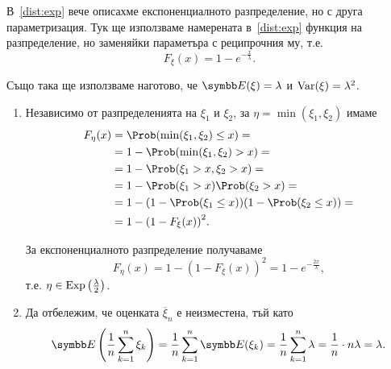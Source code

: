 \documentclass[numbers=endperiod, bibliography=totocnumbered]{scrartcl}
\begin{document}
\begin{solution}
  В~\ref{dist:exp} вече описахме експоненциалното разпределение, но с друга параметризация. Тук ще използваме намерената в~\ref{dist:exp} функция на разпределение, но заменяйки параметъра с реципрочния му, т.е.
  \begin{equation*}
    F_\xi(x) = 1 - e^{-\frac x \lambda}.
  \end{equation*}

  Също така ще използваме наготово, че \( \Expect(\xi) = \lambda \) и \( \operatorname{Var}(\xi) = \lambda^2 \).

  \begin{enumerate}[label=\alph*)]
    \item Независимо от разпределенията на \( \xi_1 \) и \( \xi_2 \), за \( \eta = \min(\xi_1, \xi_2) \) имаме
    \begin{align*}
      F_\eta(x)
      &=
      \Prob(\min(\xi_1, \xi_2) \leq x)
      = \\ &=
      1 - \Prob(\min(\xi_1, \xi_2) > x)
      = \\ &=
      1 - \Prob(\xi_1 > x, \xi_2 > x)
      = \\ &=
      1 - \Prob(\xi_1 > x) \Prob(\xi_2 > x)
      = \\ &=
      1 - (1 - \Prob(\xi_1 \leq x)) (1 - \Prob(\xi_2 \leq x))
      = \\ &=
      1 - {(1 - F_\xi(x))}^2.
    \end{align*}

    За експоненциалното разпределение получаваме
    \begin{equation*}
      F_\eta(x)
      =
      1 - {(1 - F_\xi(x))}^2
      =
      1 - e^{- \frac {2 x} \lambda},
    \end{equation*}
    т.е. \( \eta \in \operatorname{Exp}\left(\frac \lambda 2 \right) \).

    \item Да отбележим, че оценката \( \overline \xi_n \) е неизместена, тъй като
    \begin{equation*}
      \Expect\left( \frac 1 n \sum_{k=1}^n \xi_k \right)
      =
      \frac 1 n \sum_{k=1}^n \Expect(\xi_k)
      =
      \frac 1 n \sum_{k=1}^n \lambda
      =
      \frac 1 n \cdot n \lambda
      =
      \lambda.
    \end{equation*}


\end{enumerate}
\end{solution}
\end{document}
